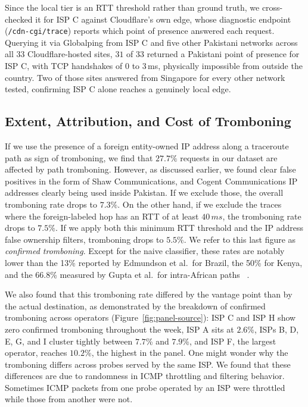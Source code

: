 \documentclass[sigconf,anonymous,10pt]{acmart}
\begin{document}
Since the local tier is an RTT threshold rather than ground truth, we cross-checked it for ISP C against Cloudflare's own edge, whose diagnostic endpoint (\texttt{/cdn-cgi/trace}) reports which point of presence answered each request. Querying it via Globalping from ISP C and five other Pakistani networks across all $33$ Cloudflare-hosted sites, $31$ of $33$ returned a Pakistani point of presence for ISP C, with TCP handshakes of 0 to $3$\,ms, physically impossible from outside the country. Two of those sites answered from Singapore for every other network tested, confirming ISP C alone reaches a genuinely local edge.



\subsection{Extent, Attribution, and Cost of Tromboning}
\label{sec:rq3}
If we use the presence of a foreign entity-owned IP address along a traceroute path as sign of tromboning, we find that $27.7\%$ requests in our dataset are affected by path tromboning. However, as discussed earlier, we found clear false positives in the form of Shaw Communications, and Cogent Communications IP addresses clearly being used inside Pakistan. If we exclude those, the overall tromboning rate drops to $7.3\%$. On the other hand, if we exclude the traces where the foreign-labeled hop has an RTT of at least $40\,ms$, the tromboning rate drops to $7.5\%$. If we apply both this minimum RTT threshold and the IP address false ownership filters, tromboning drops to $5.5\%$. We refer to this last figure as \textit{confirmed tromboning}.
Except for the naive classifier, these rates are notably lower than the 13\% reported by Edmundson et al.\ for Brazil, the 50\% for Kenya, and the 66.8\% measured by Gupta et al.\ for intra-African paths ~\cite{edmundson2016characterizing, gupta2014}. 

We also found that this tromboning rate differed by the vantage point than by the actual destination, as demonstrated by the breakdown of confirmed tromboning across operators (Figure~\ref{fig:panel-source}): ISP C and ISP H show zero confirmed tromboning throughout the week, ISP A sits at $2.6$\%, ISPs B, D, E, G, and I cluster tightly between $7.7$\% and $7.9$\%, and ISP F, the largest operator, reaches $10.2$\%, the highest in the panel. One might wonder why the tromboning differs across probes served by the same ISP. We found that these differences are due to randomness in ICMP throttling and filtering behavior. Sometimes ICMP packets from one probe operated by an ISP were throttled while those from another were not.   
\end{document}
